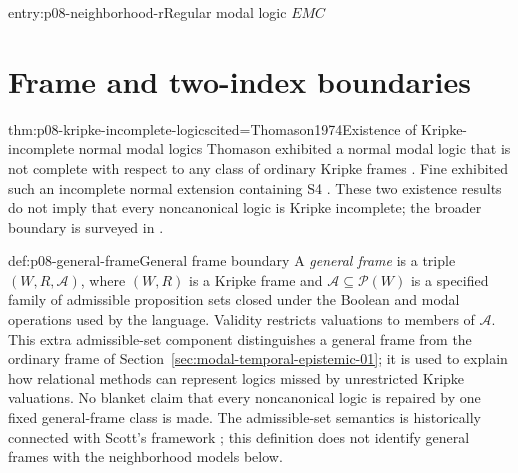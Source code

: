 \begin{systementry}{entry:p08-neighborhood-r}{Regular modal logic \(EMC\)}
\end{systementry}

\section{Frame and two-index boundaries}

\begin{hbtheorem}{thm:p08-kripke-incomplete-logics}{cited=Thomason1974}{Existence of Kripke-incomplete normal modal logics}
Thomason exhibited a normal modal logic that is not complete with respect to
any class of ordinary Kripke frames \cite{Thomason1974}.  Fine exhibited such
an incomplete normal extension containing S4 \cite{Fine1974}.  These two
existence results do not imply that every noncanonical logic is Kripke
incomplete; the broader boundary is surveyed in
\cite{ChagrovZakharyaschev1997}.
\end{hbtheorem}

\begin{hbdefinition}{def:p08-general-frame}{General frame boundary}
A \emph{general frame} is a triple \((W,R,\mathcal A)\), where
\((W,R)\) is a Kripke frame and \(\mathcal A\subseteq\mathcal P(W)\) is a
specified family of admissible proposition sets closed under the Boolean and
modal operations used by the language.  Validity restricts valuations to
members of \(\mathcal A\).  This extra admissible-set component distinguishes a
general frame from the ordinary frame of
Section~\ref{sec:modal-temporal-epistemic-01}; it is used to explain how
relational methods can represent logics missed by unrestricted Kripke
valuations.  No blanket claim that every noncanonical logic is repaired by one
fixed general-frame class is made.
The admissible-set semantics is historically connected with Scott's framework
\cite{Scott1970}; this definition does not identify general frames with the
neighborhood models below.
\end{hbdefinition}


